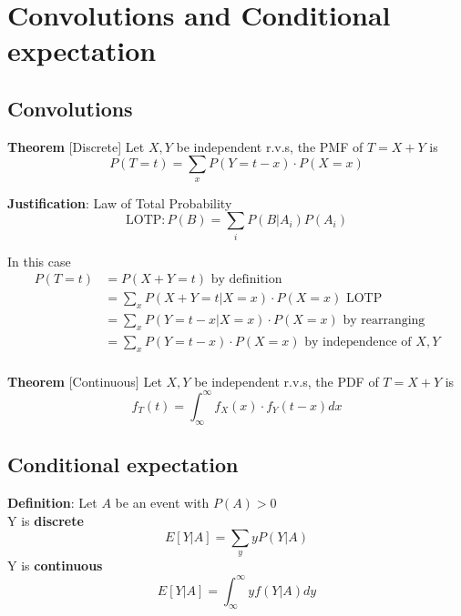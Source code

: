 \chapter{Convolutions and Conditional expectation}

\section{Convolutions}

\begin{framed}
   \textbf{Theorem} [Discrete] Let $X, Y$ be independent r.v.s, the PMF of $T = X + Y$ is 
   \[
      P(T = t) =  \sum_{x} P(Y = t - x) \cdot P(X = x)
   \] 

   \textbf{Justification}: Law of Total Probability
   \[
      \text{LOTP}: P(B) = \sum_{i}P(B | A_i) P(A_i)
   \] 

   In this case
   \begin{align*}
      P(T = t) &= P(X + Y = t) \text{ by definition} \\
               &= \sum_{x} P( X + Y = t | X = x) \cdot P(X = x)  \text{ LOTP} \\
               &= \sum_{x}P( Y = t - x | X = x) \cdot P( X = x)  \text{ by rearranging}\\
               &= \sum_{x}P( Y = t - x ) \cdot P( X = x) \text{ by independence of $X, Y$}\\ 
   \end{align*}
\end{framed}

\begin{framed}
   \textbf{Theorem} [Continuous] Let $X, Y$ be independent r.v.s, the PDF of $T = X + Y$ is
    \[
     f_T(t) = \int_{\infty}^{\infty}  f_X(x) \cdot f_Y(t - x) dx 
   \] 
  
\end{framed}

\section{Conditional expectation}

\begin{framed}
   \textbf{Definition}: Let $A$ be an event with $P(A) > 0 $ \\

   Y is \textbf{discrete}
   \[
      E[Y | A] = \sum_{y} y P(Y | A)
   \] 
   Y is \textbf{continuous}
   \[
      E[Y | A] = \int_{\infty}^{\infty}   y f(Y | A) dy 
   \] 


  
\end{framed}

